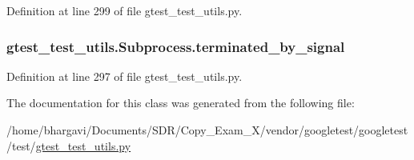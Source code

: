Definition at line 299 of file gtest\+\_\+test\+\_\+utils.\+py.

\subsubsection[{\texorpdfstring{terminated\+\_\+by\+\_\+signal}{terminated_by_signal}}]{\setlength{\rightskip}{0pt plus 5cm}gtest\+\_\+test\+\_\+utils.\+Subprocess.\+terminated\+\_\+by\+\_\+signal}\hypertarget{classgtest__test__utils_1_1_subprocess_a9654b9eddd43c93acf66d5c7b0026fca}{}\label{classgtest__test__utils_1_1_subprocess_a9654b9eddd43c93acf66d5c7b0026fca}


Definition at line 297 of file gtest\+\_\+test\+\_\+utils.\+py.



The documentation for this class was generated from the following file\+:\begin{DoxyCompactItemize}
\item 
/home/bhargavi/\+Documents/\+S\+D\+R/\+Copy\+\_\+\+Exam\+\_\+X/vendor/googletest/googletest/test/\hyperlink{gtest__test__utils_8py}{gtest\+\_\+test\+\_\+utils.\+py}\end{DoxyCompactItemize}
